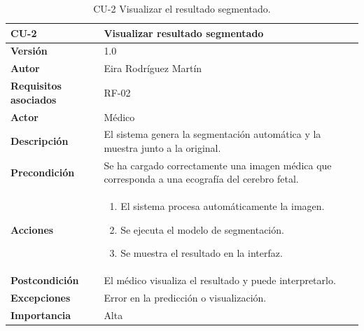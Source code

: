 \begin{table}[!h]
	\centering
	\begin{tabularx}{\linewidth}{ p{} p{} }
		\toprule
		\textbf{CU-2}    & \textbf{Visualizar resultado segmentado}\\
		\toprule
		\textbf{Versión}              & 1.0    \\
		\textbf{Autor}                & Eira Rodríguez Martín \\
		\textbf{Requisitos asociados} & RF-02 \\
        \textbf{Actor}                & Médico \\
		\textbf{Descripción}          & El sistema genera la segmentación automática y la muestra junto a la original.\\
		\textbf{Precondición}         & Se ha cargado correctamente una imagen médica que corresponda a una ecografía del cerebro fetal. \\
		\textbf{Acciones}             &
		\begin{enumerate}
			\def\labelenumi{\arabic{enumi}.}
			\tightlist
			\item El sistema procesa automáticamente la imagen.
			\item Se ejecuta el modelo de segmentación.
            \item Se muestra el resultado en la interfaz.
		\end{enumerate}\\
		\textbf{Postcondición}        & El médico visualiza el resultado y puede interpretarlo. \\
		\textbf{Excepciones}          & Error en la predicción o visualización. \\
		\textbf{Importancia}          & Alta \\
		\bottomrule
	\end{tabularx}
	\caption{CU-2 Visualizar el resultado segmentado.}
\end{table}

